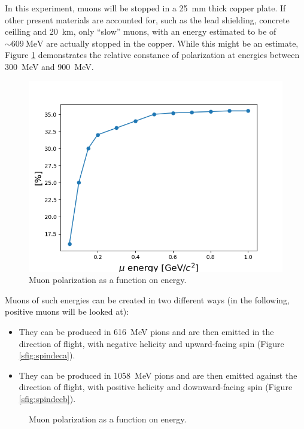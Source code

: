 In this experiment, muons will be stopped in a \SI{25}{mm} thick copper plate. If other present materials are accounted for, such as the lead shielding, concrete ceilling and \SI{20}{\km}, only ``slow'' muons, with an energy estimated to be of $\sim\SI{609}{\mega\electronvolt}$ are actually stopped in the copper. While this might be an estimate, Figure \ref{fig:mupol} demonstrates the relative constance of polarization at energies between \SI{300}{\mega\electronvolt} and \SI{900}{\mega\electronvolt}.

\begin{figure}[htbp]
\centering
\includegraphics[width=0.7\linewidth]{./fig/muonpol.png}
\caption{Muon polarization as a function on energy.}
\label{fig:mupol}
\end{figure}

Muons of such energies can be created in two different ways (in the following, positive muons will be looked at):

\begin{itemize}

\item They can be produced in \SI{616}{\mega\electronvolt} pions and are then emitted in the direction of flight, with negative helicity and upward-facing spin (Figure \ref{sfig:spindeca}).

\item They can be produced in \SI{1058}{\mega\electronvolt} pions and are then emitted against the direction of flight, with positive helicity and downward-facing spin (Figure \ref{sfig:spindecb}).

\end{itemize}

\begin{figure}[htbp]
\centering
\caption{Muon polarization as a function on energy.}
\end{figure}

